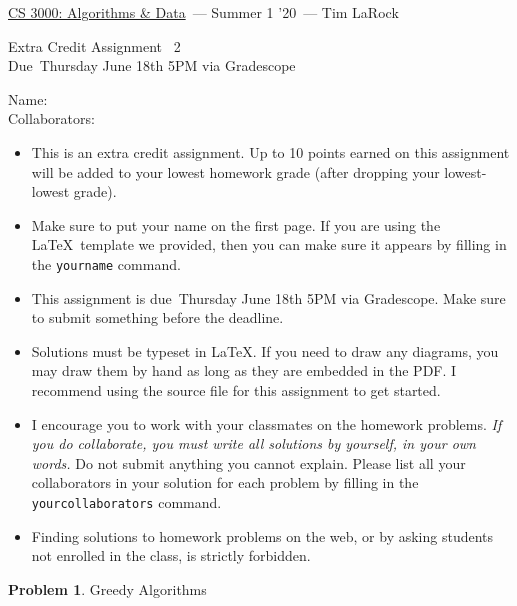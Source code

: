 \documentclass[11pt]{article}
\newcommand{\yourname}{}
\newcommand{\yourcollaborators}{}
\newcommand{\course}{\href{tlarock.github.io/teaching/cs3000/syllabus.html}{CS 3000: Algorithms \& Data}}
\newcommand{\instructor}{Tim LaRock}
\newcommand{\semester}{Summer 1 '20}
\newcommand{\hwnum}{2}
\newcommand{\hwdue}{Thursday June 18th 5PM via Gradescope}
\theoremstyle{definition}
\theoremstyle{theorem}
\newtheorem{prob}{Problem}
\begin{document}
	{\Large 
		\begin{center} \course\ --- \semester\ --- \instructor \end{center}}
	{\large
		\vspace{10pt}
		\noindent Extra Credit Assignment ~\hwnum \vspace{2pt}\\
		Due~\hwdue}
	
	\bigskip
	{\large
		\noindent Name: \yourname \vspace{2pt}\\ Collaborators: \yourcollaborators}
	
	\vspace{15pt}
	\begin{itemize}
		
		\item This is an extra credit assignment. Up to 10 points earned on this assignment will be added to your lowest homework grade (after dropping your lowest-lowest grade).
		
		\item Make sure to put your name on the first page.  If you are using the \LaTeX~template we provided, then you can make sure it appears by filling in the \texttt{yourname} command.
		
		\item This assignment is due~\hwdue.  Make sure to submit something before the deadline.
		
		\item Solutions must be typeset in \LaTeX.  If you need to draw any diagrams, you may draw them by hand as long as they are embedded in the PDF.  I recommend using the source file for this assignment to get started.
		
		\item I encourage you to work with your classmates on the homework problems. \emph{If you do collaborate, you must write all solutions by yourself, in your own words.}  Do not submit anything you cannot explain.  Please list all your collaborators in your solution for each problem by filling in the \texttt{yourcollaborators} command.
		
		\item Finding solutions to homework problems on the web, or by asking students not enrolled in the class, is strictly forbidden.
		
	\end{itemize}
	
	
	\newpage	
	\begin{prob} Greedy Algorithms\end{prob}
	
\end{document}
